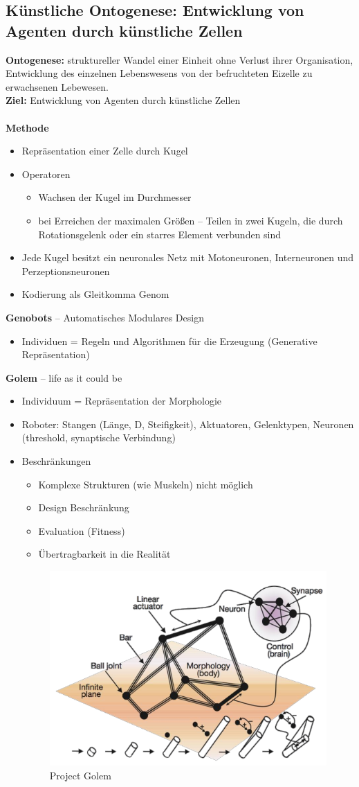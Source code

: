 \subsection{Künstliche Ontogenese: Entwicklung von Agenten durch künstliche Zellen}
\textbf{Ontogenese:}
struktureller Wandel einer Einheit ohne Verlust ihrer Organisation, Entwicklung des einzelnen Lebenswesens von der befruchteten Eizelle zu erwachsenen Lebewesen.\\
\textbf{Ziel:}
Entwicklung von Agenten durch \glqq künstliche Zellen\grqq{}\\\\
%
\textbf{Methode}
\begin{itemize}
	\item Repräsentation einer Zelle durch Kugel
	\item Operatoren 
	\begin{itemize}
		\item Wachsen der Kugel im Durchmesser
		\item bei Erreichen der maximalen Größen -- Teilen in zwei Kugeln, die durch Rotationsgelenk oder ein starres Element verbunden sind
	\end{itemize}
	\item Jede Kugel besitzt ein neuronales Netz mit Motoneuronen, Interneuronen und Perzeptionsneuronen
	\item Kodierung als Gleitkomma Genom
\end{itemize}
%
\textbf{Genobots} -- Automatisches Modulares Design
\begin{itemize}
	\item Individuen = Regeln und Algorithmen für die Erzeugung (Generative Repräsentation)
\end{itemize}
%
\textbf{Golem} -- \glqq life as it could be\grqq{}
\begin{itemize}
	\item Individuum = Repräsentation der Morphologie
	\item Roboter: Stangen (Länge, D, Steifigkeit), Aktuatoren, Gelenktypen, Neuronen (threshold, synaptische Verbindung)
	\item Beschränkungen 
	\begin{itemize}
		\item Komplexe Strukturen (wie Muskeln) nicht möglich
		\item Design Beschränkung
		\item Evaluation (Fitness)
		\item Übertragbarkeit in die Realität
	\end{itemize}
\begin{figure}[h!]
	\centering
	\includegraphics[width=.5\textwidth]{figures/ch11_golem.png}
	\caption{Project Golem}
	\label{golem}
\end{figure}
\end{itemize}
\newpage
